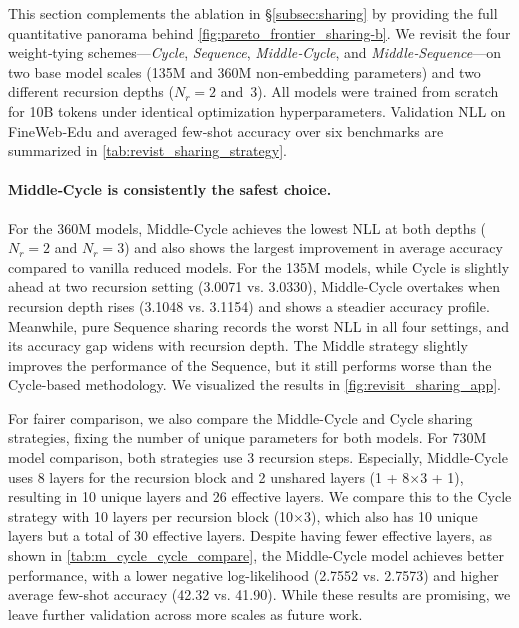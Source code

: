 This section complements the ablation in \S\ref{subsec:sharing} by providing the full quantitative panorama behind \autoref{fig:pareto_frontier_sharing-b}. We revisit the four weight‑tying schemes—\textit{Cycle}, \textit{Sequence}, \textit{Middle‑Cycle}, and \textit{Middle‑Sequence}—on two base model scales (135M and 360M non‑embedding parameters) and two different recursion depths ($N_{r}=2$ and~3). All models were trained from scratch for 10B tokens under identical optimization hyperparameters. Validation NLL on FineWeb‑Edu and averaged few‑shot accuracy over six benchmarks are summarized in \autoref{tab:revist_sharing_strategy}.


\vspace{-10pt}
\paragraph{Middle‑Cycle is consistently the safest choice.}
For the 360M models, Middle-Cycle achieves the lowest NLL at both depths ($N_{r}=2$ and $N_{r}=3$) and also shows the largest improvement in average accuracy compared to vanilla reduced models. For the 135M models, while Cycle is slightly ahead at two recursion setting (3.0071 vs. 3.0330), Middle-Cycle overtakes when recursion depth rises (3.1048 vs. 3.1154) and shows a steadier accuracy profile. Meanwhile, pure Sequence sharing records the worst NLL in all four settings, and its accuracy gap widens with recursion depth. The Middle strategy slightly improves the performance of the Sequence, but it still performs worse than the Cycle-based methodology. We visualized the results in \autoref{fig:revisit_sharing_app}.





\clearpage




For fairer comparison, we also compare the Middle-Cycle and Cycle sharing strategies, fixing the number of unique parameters for both models. For 730M model comparison, both strategies use 3 recursion steps. Especially, Middle-Cycle uses 8 layers for the recursion block and 2 unshared layers (1 + 8$\times$3 + 1), resulting in 10 unique layers and 26 effective layers. We compare this to the Cycle strategy with 10 layers per recursion block (10$\times$3), which also has 10 unique layers but a total of 30 effective layers. Despite having fewer effective layers, as shown in \autoref{tab:m_cycle_cycle_compare}, the Middle-Cycle model achieves better performance, with a lower negative log-likelihood (2.7552 vs. 2.7573) and higher average few-shot accuracy (42.32 vs. 41.90). While these results are promising, we leave further validation across more scales as future work. 

